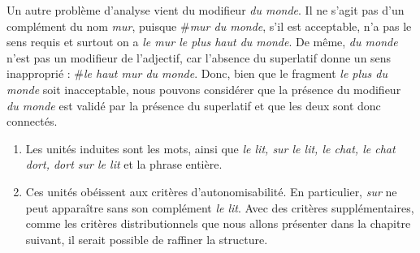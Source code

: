 {\begin{enumerate}[label=\alph*.]


Un autre problème d’analyse vient du modifieur \textit{du monde}. Il ne s’agit pas d’un complément du nom \textit{mur}, puisque \#\textit{mur du monde}, s’il est acceptable, n’a pas le sens requis et surtout on a \textit{le mur le plus haut du monde}. De même, \textit{du monde} n’est pas un modifieur de l’adjectif, car l’absence du superlatif donne un sens inapproprié : \#\textit{le haut mur du monde}. Donc, bien que le fragment \textit{le plus du monde} soit inacceptable, nous pouvons considérer que la présence du modifieur \textit{du monde} est validé par la présence du superlatif et que les deux sont donc connectés.
\end{enumerate}

\begin{enumerate}[label=\alph*.]
\item Les unités induites sont les mots, ainsi que \textit{le lit, sur le lit, le chat, le chat dort, dort sur le lit} et la phrase entière.
\item Ces unités obéissent aux critères d’autonomisabilité. En particulier, \textit{sur} ne peut apparaître sans son complément \textit{le lit}. Avec des critères supplémentaires, comme les critères distributionnels que nous allons présenter dans la chapitre suivant, il serait possible de raffiner la structure.
\end{enumerate}}
